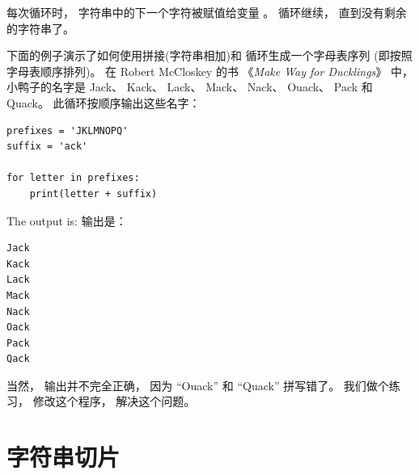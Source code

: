 %
  

每次循环时， 字符串中的下一个字符被赋值给变量  。  循环继续， 直到没有剩余的字符串了。


下面的例子演示了如何使用拼接(字符串相加)和  循环生成一个字母表序列 (即按照字母表顺序排列)。  在 Robert McCloskey 的书 《{\em Make Way for Ducklings}》 中， 小鸭子的名字是 Jack、 Kack、 Lack、 Mack、 Nack、 Ouack、 Pack 和 Quack。  此循环按顺序输出这些名字：
 

\begin{lstlisting}
prefixes = 'JKLMNOPQ'
suffix = 'ack'

for letter in prefixes:
    print(letter + suffix)
\end{lstlisting}

%
The output is:
输出是：

\begin{lstlisting}
Jack
Kack
Lack
Mack
Nack
Oack
Pack
Qack
\end{lstlisting}

%

当然， 输出并不完全正确， 因为 ``Ouack'' 和 ``Quack'' 拼写错了。  我们做个练习， 修改这个程序， 解决这个问题。


\section{字符串切片}
\label{slice}
  
 
  
 



